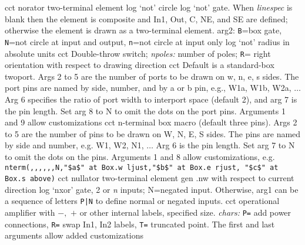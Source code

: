   {cct}
  { norator two-terminal element }
  {log}
  {`not' circle}
  {log}
  {`not' gate.
   When {\sl linespec} is blank then the element is composite and In1,
   Out, C, NE, and SE are defined; otherwise the element is drawn as
   a two-terminal element. arg2: {\tt B}=box gate, {\tt N}=not circle at input
   and output, {\tt n}=not circle at input only 
    }
  {log}
  {`not' radius in absolute units}
  {cct}
  {Double-throw switch; {\sl npoles:} number of poles;
   {\tt R}= right orientation with respect to drawing direction
   }
  {cct}
  { Default is a standard-box twoport.  Args 2 to 5 are
    the number of ports to be drawn on w, n, e, s sides.
    The port pins are named by side, number, and by a or b pin,
    e.g., W1a, W1b, W2a, $\ldots$
    Arg 6 specifies the ratio of port width to interport space (default 2),
    and arg 7 is the pin length.  Set arg 8 to N to omit the dots on
    the port pins. Arguments 1 and 9 allow customizations
   }
  {cct}
  {n-terminal box macro (default three pins).
   Args 2 to 5 are the number of pins to be drawn on W, N, E, S sides.
   The pins are named by side and number, e.g. W1, W2, N1, $\ldots$
   Arg 6 is the pin length.  Set arg 7 to N to omit the dots
   on the pins. Arguments 1 and 8 allow customizations, e.g.
   {\tt nterm(,{,},{,},{,}N,"\$a\$" at Box.w ljust,"\$b\$" at Box.e rjust,
      "\$c\$" at Box.s above)} }
  {cct}
  { nullator two-terminal element }
  {gen}
  {.nw with respect to current direction}
  {log}
  {`nxor' gate, 2 or {\sl n\/} inputs; N=negated input.
   Otherwise, arg1 can be a sequence of letters {\tt P|N}
   to define normal or negated inputs.
    }
  {cct}
  {operational amplifier with $-,$ $+$ or other internal labels,
    specified size. {\sl chars:} {\tt P=} add power connections,
    {\tt R=} swap In1, In2 labels,
    {\tt T=} truncated point.
    The first and last arguments allow added customizations 
   }

